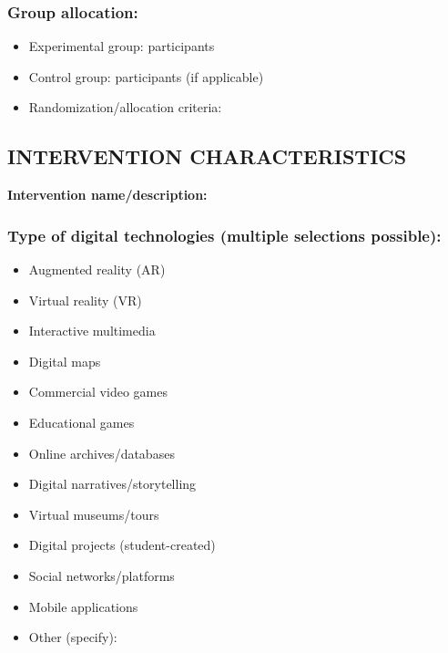 \documentclass[
hf,
]{ceurart}
\begin{document}
\subsubsection*{Group allocation:}
\begin{itemize}
    \item Experimental group: \underline{\hspace{2cm}} participants
    \item Control group: \underline{\hspace{2cm}} participants (if applicable)
    \item Randomization/allocation criteria: \underline{\hspace{5cm}}
\end{itemize}

\subsection*{INTERVENTION CHARACTERISTICS}

\noindent\textbf{Intervention name/description:} \underline{\hspace{8cm}}

\subsubsection*{Type of digital technologies (multiple selections possible):}
\begin{itemize}[label=$\square$]
    \item Augmented reality (AR)
    \item Virtual reality (VR)
    \item Interactive multimedia
    \item Digital maps
    \item Commercial video games
    \item Educational games
    \item Online archives/databases
    \item Digital narratives/storytelling
    \item Virtual museums/tours
    \item Digital projects (student-created)
    \item Social networks/platforms
    \item Mobile applications
    \item Other (specify): \underline{\hspace{4cm}}
\end{itemize}
\end{document}
